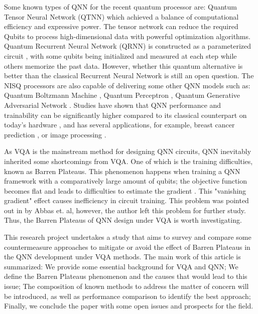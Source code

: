 Some known types of QNN for the recent quantum processor are: 
Quantum Tensor Neural Network (QTNN) \cite{hugginsQuantumMachineLearning2019} which achieved a balance of computational efficiency and expressive power. 
The tensor network can reduce the required Qubits to process high-dimensional data with powerful optimization algorithms.
Quantum Recurrent Neural Network (QRNN) is constructed as a parameterized circuit \cite{takakiLearningTemporalData2021}, with some qubits being initialized and measured at each step while others memorize the past data.
However, whether this quantum alternative is better than the classical Recurrent Neural Network is still an open question.
The NISQ processors are also capable of delivering some other QNN models such as: 
Quantum Boltzmann Machine \cite{shinguBoltzmannMachineLearning2021}\cite{zoufalVariationalQuantumBoltzmann2021}, 
Quantum Perceptron \cite{kristensenArtificialSpikingQuantum2021}, 
Quantum Generative Adversarial Network \cite{dallaire-demersQuantumGenerativeAdversarial2018}\cite{lloydQuantumGenerativeAdversarial2018}. Studies have shown that QNN performance and trainability can be significantly higher compared to its classical counterpart on today's hardware \cite{abbasPowerQuantumNeural2021, colesSeekingQuantumAdvantage2021}, and has several applications, for example, breast cancer prediction \cite{liModelAlgorithmQuantuminspired2014}, or image processing \cite{matsuiQubitNeuralNetwork2009}.

As VQA is the mainstream method for designing QNN circuits, QNN inevitably inherited some shortcomings from VQA.
One of which is the training difficulties, known as Barren Plateaus.
This phenomenon happens when training a QNN framework with a comparatively large amount of qubits; the objective function becomes flat and leads to difficulties to estimate the gradient \cite{mccleanBarrenPlateausQuantum2018, zhaoAnalyzingBarrenPlateau2021}. This "vanishing gradient" effect causes inefficiency in circuit training. 
This problem was pointed out in \cite{abbasPowerQuantumNeural2021} by Abbas et. al, however, the author left this problem for further study. 
Thus, the Barren Plateaus of QNN design under VQA is worth investigating.

This research project undertakes a study that aims to survey and compare some countermeasure approaches to mitigate or avoid the effect of Barren Plateaus in the QNN development under VQA methods. 
The main work of this article is summarized: 
We provide some essential background for VQA and QNN;
We define the Barren Plateaus phenomenon and the causes that would lead to this issue; 
The composition of known methods to address the matter of concern will be introduced, as well as performance comparison to identify the best approach; 
Finally, we conclude the paper with some open issues and prospects for the field.


